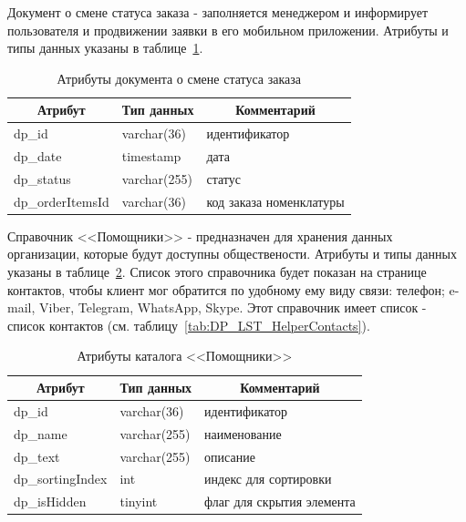 Документ о смене статуса заказа - заполняется менеджером и информирует
пользователя и продвижении заявки в его мобильном приложении.
Атрибуты и типы данных указаны в таблице~\ref{tab:DP_DOC_OrderStatuses}.

\begin{table}[!htb]
    \centering\small

    \caption{Атрибуты документа о смене статуса заказа}
    \label{tab:DP_DOC_OrderStatuses}

    \begin{tabular}{|p{5cm}|p{2.5cm}|p{9cm}|}
        \hline
        \multicolumn{1}{|c|}{Атрибут}
        & \multicolumn{1}{c|}{Тип данных}
        & \multicolumn{1}{c|}{Комментарий}
        \\ \hline

        dp\_id & varchar(36) & идентификатор \\ \hline
        dp\_date & timestamp & дата \\ \hline
        dp\_status & varchar(255) & статус \\ \hline
        dp\_orderItemsId & varchar(36) & код заказа номенклатуры \\ \hline
    \end{tabular}
\end{table}

Справочник <<Помощники>> - предназначен для хранения данных организации, которые будут доступны обществености.
Атрибуты и типы данных указаны в таблице~\ref{tab:DP_CTL_Helpers}.
Список этого справочника будет показан на странице контактов,
чтобы клиент мог обратится по удобному ему виду связи:
телефон; e-mail, Viber, Telegram, WhatsApp, Skype.
Этот справочник имеет список - список контактов (см. таблицу~\ref{tab:DP_LST_HelperContacts}).

\begin{table}[!htb]
    \centering\small

    \caption{Атрибуты каталога <<Помощники>>}
    \label{tab:DP_CTL_Helpers}

    \begin{tabular}{|p{5cm}|p{2.5cm}|p{9cm}|}
        \hline
        \multicolumn{1}{|c|}{Атрибут}
        & \multicolumn{1}{c|}{Тип данных}
        & \multicolumn{1}{c|}{Комментарий}
        \\ \hline

        dp\_id & varchar(36) & идентификатор \\ \hline
        dp\_name & varchar(255) & наименование \\ \hline
        dp\_text & varchar(255) & описание \\ \hline
        dp\_sortingIndex & int & индекс для сортировки \\ \hline
        dp\_isHidden & tinyint & флаг для скрытия элемента \\ \hline
    \end{tabular}
\end{table}

